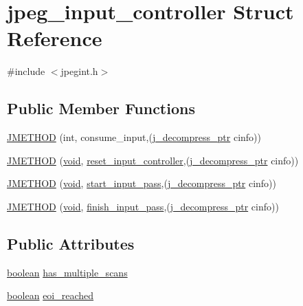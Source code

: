 \hypertarget{structjpeg__input__controller}{}\section{jpeg\+\_\+input\+\_\+controller Struct Reference}
\label{structjpeg__input__controller}


{\ttfamily \#include $<$jpegint.\+h$>$}

\subsection*{Public Member Functions}
\begin{DoxyCompactItemize}
\item 
\hyperlink{structjpeg__input__controller_af742c796479db5dd8b3275307d76a103}{J\+M\+E\+T\+H\+O\+D} (int, consume\+\_\+input,(\hyperlink{jpeglib_8h_a00c7d78af44bd26a901c791ccfc1e178}{j\+\_\+decompress\+\_\+ptr} cinfo))
\item 
\hyperlink{structjpeg__input__controller_aa2720adb6f991abedb2e8c03804cac4f}{J\+M\+E\+T\+H\+O\+D} (\hyperlink{png_8h_aa8c59027f9ab2769342f248709d68d17}{void}, \hyperlink{jdinput_8c_a93f58ee9099d00fef5d7e3891aa9e54f}{reset\+\_\+input\+\_\+controller},(\hyperlink{jpeglib_8h_a00c7d78af44bd26a901c791ccfc1e178}{j\+\_\+decompress\+\_\+ptr} cinfo))
\item 
\hyperlink{structjpeg__input__controller_aef985c09924396a078c67592da47d679}{J\+M\+E\+T\+H\+O\+D} (\hyperlink{png_8h_aa8c59027f9ab2769342f248709d68d17}{void}, \hyperlink{jdinput_8c_abc0a94e24edf93bc7f914cf4a698a870}{start\+\_\+input\+\_\+pass},(\hyperlink{jpeglib_8h_a00c7d78af44bd26a901c791ccfc1e178}{j\+\_\+decompress\+\_\+ptr} cinfo))
\item 
\hyperlink{structjpeg__input__controller_a70620c8e0ea8fd2f7b0243cd9bf395e1}{J\+M\+E\+T\+H\+O\+D} (\hyperlink{png_8h_aa8c59027f9ab2769342f248709d68d17}{void}, \hyperlink{jdinput_8c_a9777f7fabb58d9a42f34510bf0a71d1c}{finish\+\_\+input\+\_\+pass},(\hyperlink{jpeglib_8h_a00c7d78af44bd26a901c791ccfc1e178}{j\+\_\+decompress\+\_\+ptr} cinfo))
\end{DoxyCompactItemize}
\subsection*{Public Attributes}
\begin{DoxyCompactItemize}
\item 
\hyperlink{jmorecfg_8h_a7c6368b321bd9acd0149b030bb8275ed}{boolean} \hyperlink{structjpeg__input__controller_a6f02f9c18464bfbf30b27f5a43c2665a}{has\+\_\+multiple\+\_\+scans}
\item 
\hyperlink{jmorecfg_8h_a7c6368b321bd9acd0149b030bb8275ed}{boolean} \hyperlink{structjpeg__input__controller_a8e1c345f356d36f98c2ece4dc21549d7}{eoi\+\_\+reached}
\end{DoxyCompactItemize}


